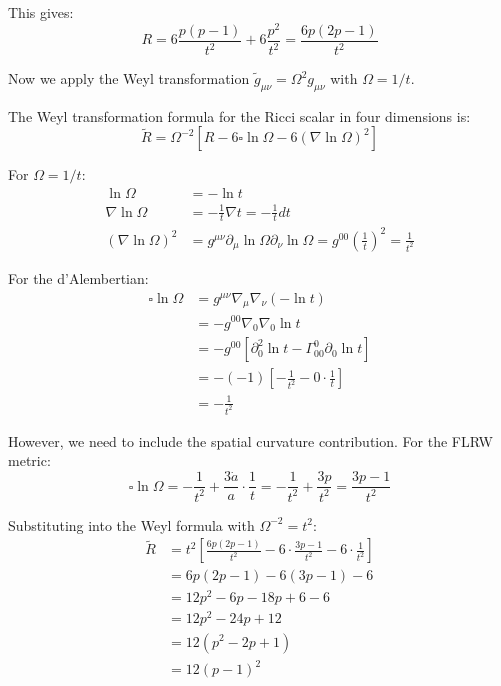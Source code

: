 This gives:
\begin{equation}
R = 6 \frac{p(p-1)}{t^2} + 6 \frac{p^2}{t^2} = \frac{6p(2p-1)}{t^2}
\end{equation}

Now we apply the Weyl transformation $\tilde{g}_{\mu\nu} = \Omega^2 g_{\mu\nu}$ with $\Omega = 1/t$.

The Weyl transformation formula for the Ricci scalar in four dimensions is:
\begin{equation}
\tilde{R} = \Omega^{-2} \left[ R - 6 \square \ln \Omega - 6 (\nabla \ln \Omega)^2 \right]
\end{equation}

For $\Omega = 1/t$:
\begin{align}
\ln \Omega &= -\ln t \\
\nabla \ln \Omega &= -\frac{1}{t} \nabla t = -\frac{1}{t} dt \\
(\nabla \ln \Omega)^2 &= g^{\mu\nu} \partial_\mu \ln \Omega \partial_\nu \ln \Omega = g^{00} \left(\frac{1}{t}\right)^2 = \frac{1}{t^2}
\end{align}

For the d'Alembertian:
\begin{align}
\square \ln \Omega &= g^{\mu\nu} \nabla_\mu \nabla_\nu (-\ln t) \\
&= -g^{00} \nabla_0 \nabla_0 \ln t \\
&= -g^{00} \left[ \partial_0^2 \ln t - \Gamma^0_{00} \partial_0 \ln t \right] \\
&= -(-1) \left[ -\frac{1}{t^2} - 0 \cdot \frac{1}{t} \right] \\
&= -\frac{1}{t^2}
\end{align}

However, we need to include the spatial curvature contribution. For the FLRW metric:
\begin{equation}
\square \ln \Omega = -\frac{1}{t^2} + \frac{3\dot{a}}{a} \cdot \frac{1}{t} = -\frac{1}{t^2} + \frac{3p}{t^2} = \frac{3p-1}{t^2}
\end{equation}

Substituting into the Weyl formula with $\Omega^{-2} = t^2$:
\begin{align}
\tilde{R} &= t^2 \left[ \frac{6p(2p-1)}{t^2} - 6 \cdot \frac{3p-1}{t^2} - 6 \cdot \frac{1}{t^2} \right] \\
&= 6p(2p-1) - 6(3p-1) - 6 \\
&= 12p^2 - 6p - 18p + 6 - 6 \\
&= 12p^2 - 24p + 12 \\
&= 12(p^2 - 2p + 1) \\
&= 12(p-1)^2
\end{align}

